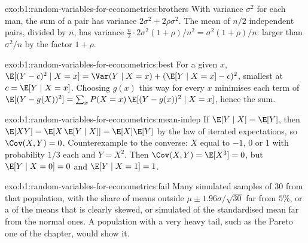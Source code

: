 \begin{solution}{exo:b1:random-variables-for-econometrics:brothers}
With variance $\sigma^2$ for each man, the sum of a pair has variance $2\sigma^2 + 2\rho\sigma^2$.
The mean of $n/2$ independent pairs, divided by $n$, has variance
$\frac{n}{2}\cdot 2\sigma^2(1 + \rho)/n^2 = \sigma^2(1 + \rho)/n$: larger than $\sigma^2/n$ by the factor $1 + \rho$.
\end{solution}

\begin{solution}{exo:b1:random-variables-for-econometrics:best}
For a given $x$, $\E[(Y - c)^2 \mid X = x] = \Var(Y \mid X = x) + (\E[Y \mid X = x] - c)^2$, smallest at
$c = \E[Y \mid X = x]$. Choosing $g(x)$ this way for every $x$ minimises each term of
$\E[(Y - g(X))^2] = \sum_x P(X = x)\,\E[(Y - g(x))^2 \mid X = x]$, hence the sum.
\end{solution}

\begin{solution}{exo:b1:random-variables-for-econometrics:mean-indep}
If $\E[Y \mid X] = \E[Y]$, then $\E[XY] = \E[X\,\E[Y \mid X]] = \E[X]\E[Y]$ by the law of iterated
expectations, so $\Cov(X, Y) = 0$. Counterexample to the converse: $X$ equal to $-1$, 0
or 1 with probability $1/3$ each and $Y = X^2$. Then $\Cov(X, Y) = \E[X^3] = 0$, but
$\E[Y \mid X = 0] = 0$ and $\E[Y \mid X = 1] = 1$.
\end{solution}

\begin{solution}{exo:b1:random-variables-for-econometrics:fail}
Many simulated samples of 30 from that population, with the share of
means outside $\mu \pm 1.96\sigma/\sqrt{30}$ far from $5\%$, or a  of the means that
is clearly skewed, or simulated  of the standardised mean far
from the normal ones. A population with a very heavy tail, such as the
Pareto one of the chapter, would show it.
\end{solution}

